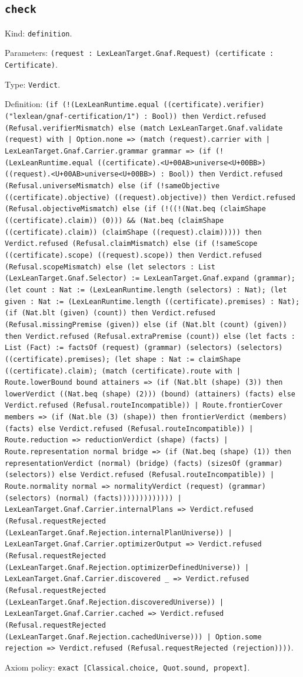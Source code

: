 \documentclass[11pt]{article}
\begin{document}
\subsection*{\texttt{check}}
\noindent Kind: \texttt{definition}.\par
\noindent Parameters: \texttt{(request : LexLeanTarget.Gnaf.Request) (certificate : Certificate)}.\par
\noindent Type: \texttt{Verdict}.\par
\noindent Definition: \texttt{(if (!(LexLeanRuntime.equal ((certificate).verifier) ("lexlean/gnaf-certification/1") : Bool)) then Verdict.refused (Refusal.verifierMismatch) else (match LexLeanTarget.Gnaf.validate (request) with | Option.none => (match (request).carrier with | LexLeanTarget.Gnaf.Carrier.grammar grammar => (if (!(LexLeanRuntime.equal ((certificate).<U+00AB>universe<U+00BB>) ((request).<U+00AB>universe<U+00BB>) : Bool)) then Verdict.refused (Refusal.universeMismatch) else (if (!sameObjective ((certificate).objective) ((request).objective)) then Verdict.refused (Refusal.objectiveMismatch) else (if (!((!(Nat.beq (claimShape ((certificate).claim)) (0))) \&\& (Nat.beq (claimShape ((certificate).claim)) (claimShape ((request).claim))))) then Verdict.refused (Refusal.claimMismatch) else (if (!sameScope ((certificate).scope) ((request).scope)) then Verdict.refused (Refusal.scopeMismatch) else (let selectors : List (LexLeanTarget.Gnaf.Selector) := LexLeanTarget.Gnaf.expand (grammar); (let count : Nat := (LexLeanRuntime.length (selectors) : Nat); (let given : Nat := (LexLeanRuntime.length ((certificate).premises) : Nat); (if (Nat.blt (given) (count)) then Verdict.refused (Refusal.missingPremise (given)) else (if (Nat.blt (count) (given)) then Verdict.refused (Refusal.extraPremise (count)) else (let facts : List (Fact) := factsOf (request) (grammar) (selectors) (selectors) ((certificate).premises); (let shape : Nat := claimShape ((certificate).claim); (match (certificate).route with | Route.lowerBound bound attainers => (if (Nat.blt (shape) (3)) then lowerVerdict ((Nat.beq (shape) (2))) (bound) (attainers) (facts) else Verdict.refused (Refusal.routeIncompatible)) | Route.frontierCover members => (if (Nat.ble (3) (shape)) then frontierVerdict (members) (facts) else Verdict.refused (Refusal.routeIncompatible)) | Route.reduction => reductionVerdict (shape) (facts) | Route.representation normal bridge => (if (Nat.beq (shape) (1)) then representationVerdict (normal) (bridge) (facts) (sizesOf (grammar) (selectors)) else Verdict.refused (Refusal.routeIncompatible)) | Route.normality normal => normalityVerdict (request) (grammar) (selectors) (normal) (facts))))))))))))) | LexLeanTarget.Gnaf.Carrier.internalPlans => Verdict.refused (Refusal.requestRejected (LexLeanTarget.Gnaf.Rejection.internalPlanUniverse)) | LexLeanTarget.Gnaf.Carrier.optimizerOutput => Verdict.refused (Refusal.requestRejected (LexLeanTarget.Gnaf.Rejection.optimizerDefinedUniverse)) | LexLeanTarget.Gnaf.Carrier.discovered \_ => Verdict.refused (Refusal.requestRejected (LexLeanTarget.Gnaf.Rejection.discoveredUniverse)) | LexLeanTarget.Gnaf.Carrier.cached => Verdict.refused (Refusal.requestRejected (LexLeanTarget.Gnaf.Rejection.cachedUniverse))) | Option.some rejection => Verdict.refused (Refusal.requestRejected (rejection))))}.\par
\noindent Axiom policy: \texttt{exact [Classical.choice, Quot.sound, propext]}.\par
\end{document}
